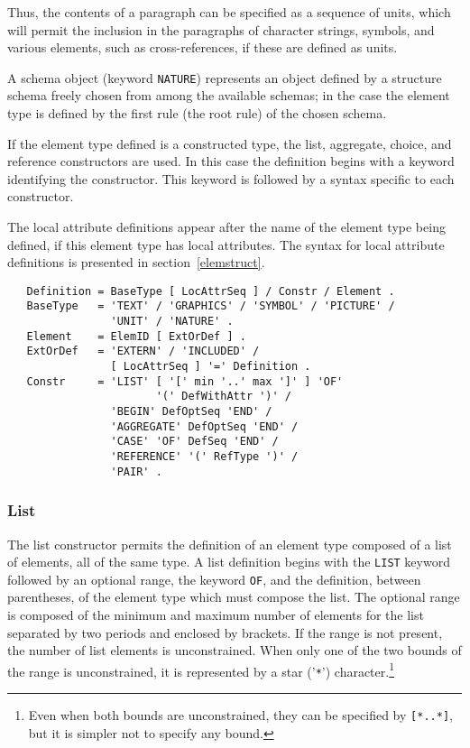 Thus, the contents of a paragraph can be specified as a sequence of
units, which will permit the inclusion in the paragraphs of character
strings, symbols, and various elements, such as cross-references, if
these are defined as units.

A schema object (keyword {\tt NATURE}) represents an object defined by
a structure schema freely chosen from among the available schemas;
in the case the element type is defined by the first rule (the root rule)
of the chosen schema.

If the element type defined is a constructed type, the list, aggregate,
choice, and reference constructors are used.  In this case the
definition begins with a keyword identifying the constructor.  This
keyword is followed by a syntax specific to each constructor.

The local attribute definitions appear after the name of the 
element type being defined, if this element type has local attributes.
The syntax for local attribute definitions is presented in section~\ref{elemstruct}.

\begin{verbatim}
   Definition = BaseType [ LocAttrSeq ] / Constr / Element .
   BaseType   = 'TEXT' / 'GRAPHICS' / 'SYMBOL' / 'PICTURE' /
                'UNIT' / 'NATURE' .
   Element    = ElemID [ ExtOrDef ] .
   ExtOrDef   = 'EXTERN' / 'INCLUDED' / 
                [ LocAttrSeq ] '=' Definition .
   Constr     = 'LIST' [ '[' min '..' max ']' ] 'OF'
                       '(' DefWithAttr ')' /
                'BEGIN' DefOptSeq 'END' /
                'AGGREGATE' DefOptSeq 'END' /
                'CASE' 'OF' DefSeq 'END' /
                'REFERENCE' '(' RefType ')' /
                'PAIR' .
\end{verbatim}

\subsubsection{List}

The list constructor permits the definition of an element type
composed of a list of elements, all of the same type.  A list
definition begins with the {\tt LIST} keyword followed by an optional
range, the keyword {\tt OF}, and the definition, between parentheses,
of the element type which must compose the list.  The optional range
is composed of the minimum and maximum number of elements for the list
separated by two periods and enclosed by brackets.  If the range is
not present, the number of list elements is unconstrained.  When only
one of the two bounds of the range is unconstrained, it is represented
by a star ('\verb|*|') character.\footnote{Even when both bounds are
unconstrained, they can be specified by {\tt [\verb|*|..\verb|*|]}, but
it is simpler not to specify any bound.}

